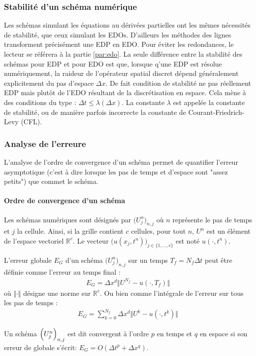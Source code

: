     \subsubsection{Stabilité d'un schéma numérique}\label{par:stab_edp}
        Les schémas simulant les équations au dérivées partielles ont les mêmes nécessités de stabilité, que ceux simulant les EDOs. 
        D'ailleurs les méthodes des lignes transforment précisément une EDP en EDO. 
        Pour éviter les redondances, le lecteur se référera à la partie \ref{par:edo}. La seule différence entre la stabilité des schémas pour EDP et pour EDO est que,
        lorsque q'une EDP est résolue numériquement, la raideur de l'opérateur spatial discret dépend généralement explicitement du pas d'espace $\Delta x$.
        De fait condition de stabilité ne pas réellement EDP mais plutôt de l'EDO résultant de la discrétisation en espace. Cela mène à 
        des conditions du type : $\Delta t \leq \lambda(\Delta x)$. La constante $\lambda$ est appelée la constante de stabilité,
        ou de manière parfois incorrecte la constante de Courant-Friedrich-Levy (CFL).
    \subsubsection{Analyse de l'erreure}
        L'analyse de l'ordre de convergence d'un schéma permet de quantifier l'erreur asymptotique 
        (c'est à dire lorsque les pas de temps et d'espace sont "assez petits") que commet le schéma.
        \paragraph{Ordre de convergence d'un schéma}\label{par:conv_edp}
        Les schémas numériques sont désignés par $\bigl(U^n_j\bigr)_{n,j}$ où $n$ représente le pas de temps 
        et $j$ la cellule. Ainsi, si la grille contient $c$ cellules, 
        pour tout $n$, $U^n$ est un élément de l'espace vectoriel $\mathbb{R}^c$.
        Le vecteur $\bigl(u(x_j,t^n)\bigr)_{j \in \{1,\ldots,c\}}$ est noté $u(\cdot,t^n)$.

        \begin{definition}
        L'erreur globale $E_G$ d'un schéma $\bigl(U^n_j\bigr)_{n,j}$ sur un temps $T_f = N_f \Delta t$ peut être définie comme l'erreur au temps final :
        \begin{align}
        E_G = \Delta x^d \Vert U^{N_f} - u(\cdot , T_f) \Vert
        \end{align}
        où $\Vert \cdot \Vert$ désigne une norme sur $\mathbb{R}^c$.
        Ou bien comme l'intégrale de l'erreur sur tous les pas de temps :
        \begin{align}
        E_G = \sum_{k=0}^{N_f}\Delta x^d \Vert U^{k} - u(\cdot , t^k) \Vert
        \end{align}
        \end{definition}
        \begin{definition}
            Un schéma $\Bigl(U^n_j\Bigr)_{n,j}$ est dit convergent à l'ordre $p$ en temps et $q$ en espace si 
            son erreur de globale s'écrit: $E_G = O(\Delta t^{p} + \Delta x^{q})$.
        \end{definition}

